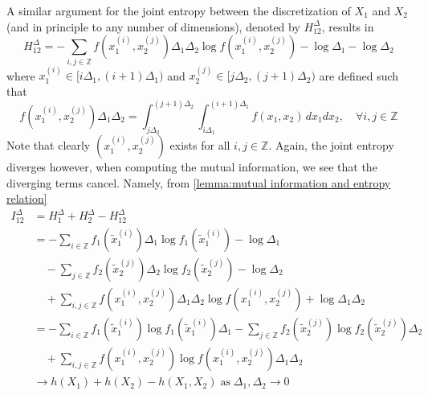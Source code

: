 \documentclass[../Thesis.tex]{subfiles}
\begin{document}
A similar argument for the joint entropy between the discretization of $X_1$ and $X_2$ (and in principle to any number of dimensions), denoted by $H^{\Delta}_{12}$, results in
$$H^{\Delta}_{12} = -\sum_{i,j \in \mathbb{Z}} f\left(x_1^{(i)}, x_2^{(j)}\right) \Delta_1 \Delta_2 \log{f\left(x_1^{(i)}, x_2^{(j)}\right)} - \log{\Delta_1} - \log{\Delta_2}$$
where $x_1^{(i)}\in[i\Delta_1, (i+1)\Delta_1)$ and $x_2^{(j)}\in [j\Delta_2, (j+1)\Delta_2)$ are defined such that
$$f\left(x_1^{(i)}, x_2^{(j)}\right)\Delta_1 \Delta_2 = \int_{j\Delta_2}^{(j+1)\Delta_2}\int_{i\Delta_1}^{(i+1)\Delta_1} f(x_1,x_2) \, dx_1 dx_2,\quad \forall i,j\in\mathbb{Z}$$
Note that clearly $\left(x_1^{(i)},x_2^{(j)}\right)$ exists for all $i,j\in \mathbb{Z}$. Again, the joint entropy diverges however, when computing the mutual information, we see that the diverging terms cancel. Namely, from \autoref{lemma:mutual information and entropy relation}
\begin{align*}
    I^{\Delta}_{12} & = H^{\Delta}_1 + H^{\Delta}_2 - H^{\Delta}_{12}                                                                                                                                                                      \\
                    & = -\sum_{i\in\mathbb{Z}} f_1\left(\tilde{x}_1^{(i)}\right) \Delta_1 \log{f_1\left(\tilde{x}_1^{(i)}\right)} - \log{\Delta_1}                                                                                         \\
                    & \quad - \sum_{j\in\mathbb{Z}} f_2\left(\tilde{x}_2^{(j)}\right) \Delta_2 \log{f_2\left(\tilde{x}_2^{(j)}\right)} - \log{\Delta_2}                                                                                    \\
                    & \quad + \sum_{i,j\in\mathbb{Z}} f\left(x_1^{(i)},x_2^{(j)}\right) \Delta_1 \Delta_2 \log{f\left(x_1^{(i)},x_2^{(j)}\right)} + \log{\Delta_1 \Delta_2}                                                                \\
                    & =-\sum_{i\in\mathbb{Z}} f_1\left(\tilde{x}_1^{(i)}\right) \log{f_1\left(\tilde{x}_1^{(i)}\right)}\Delta_1 - \sum_{j\in\mathbb{Z}} f_2\left(\tilde{x}_2^{(j)}\right)  \log{f_2\left(\tilde{x}_2^{(j)}\right)}\Delta_2 \\
                    & \quad +\sum_{i,j\in\mathbb{Z}} f\left(x_1^{(i)},x_2^{(j)}\right) \log{f\left(x_1^{(i)},x_2^{(j)}\right)} \Delta_1 \Delta_2                                                                                           \\
                    & \to h(X_1) + h(X_2) - h(X_1,X_2)\; \text{as}\; \Delta_1,\Delta_2 \to 0
\end{align*}
\end{document}
